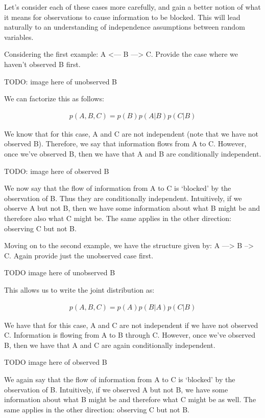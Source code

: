 Let's consider each of these cases more carefully, and gain a better notion of what it means for observations to cause information to be blocked. This will lead naturally to an understanding of independence assumptions between random variables.

Considering the first example: A <--- B ---> C. Provide the case where we haven't observed B first.

TODO: image here of unobserved B

We can factorize this as follows:

\begin{align*}
	p(A, B, C) = p(B) p(A | B) p(C | B)
\end{align*}

We know that for this case, A and C are not independent (note that we have not observed B). Therefore, we say that information flows from A to C. However, once we've observed B, then we have that A and B are conditionally independent.

TODO: image here of observed B

We now say that the flow of information from A to C is `blocked' by the observation of B. Thus they are conditionally independent. Intuitively, if we observe A but not B, then we have some information about what B might be and therefore also what C might be. The same applies in the other direction: observing C but not B.

Moving on to the second example, we have the structure given by: A ---> B --> C. Again provide just the unobserved case first.

TODO image here of unobserved B

This allows us to write the joint distribution as:

\begin{align*}
	p(A, B, C) = p(A) p(B | A) p(C | B)
\end{align*}

We have that for this case, A and C are not independent if we have not observed C. Information is flowing from A to B through C. However, once we've observed B, then we have that A and C are again conditionally independent.

TODO image here of observed B

We again say that the flow of information from A to C is `blocked' by the observation of B. Intuitively, if we observed A but not B, we have some information about what B might be and therefore what C might be as well.  The same applies in the other direction: observing C but not B.

